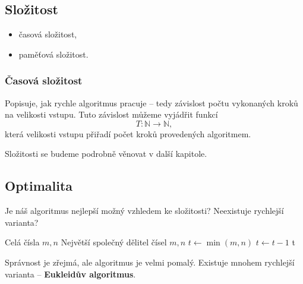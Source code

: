 \documentclass[openany,12pt,a4paper]{book}
\begin{document}
\subsection{Složitost}

\begin{itemize}
	\item časová složitost,
	\item paměťová složitost.
\end{itemize}

\subsubsection{Časová složitost}

Popisuje, jak rychle algoritmus pracuje – tedy závislost počtu vykonaných kroků na velikosti vstupu.  
Tuto závislost můžeme vyjádřit funkcí
\[
T: \mathbb{N} \to \mathbb{N},
\]
která velikosti vstupu přiřadí počet kroků provedených algoritmem.

Složitosti se budeme podrobně věnovat v další kapitole.

\subsection{Optimalita}
Je náš algoritmus nejlepší možný vzhledem ke složitosti?  
Neexistuje rychlejší varianta?

\begin{algorithm}
\caption{Největší společný dělitel — naivní verze}
\begin{algorithmic}
\Require Celá čísla $m, n$
\Ensure Největší společný dělitel čísel $m, n$
\State $t \gets \min(m, n)$
	\State $t \gets t - 1$
\EndWhile
\State \Return t
\end{algorithmic}
\end{algorithm}

Správnost je zřejmá, ale algoritmus je velmi pomalý.  
Existuje mnohem rychlejší varianta – \textbf{Eukleidův algoritmus}.
\end{document}
